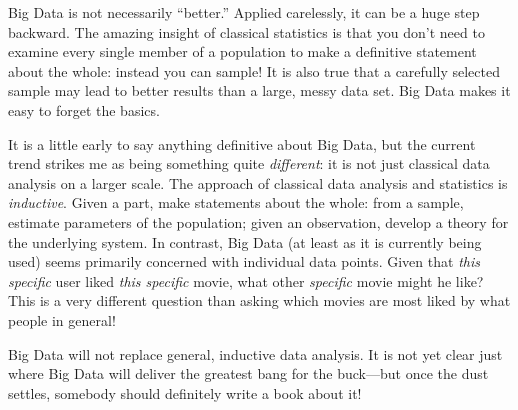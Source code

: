Big Data is not necessarily ``better.''  Applied carelessly, it can
be a huge step backward. The amazing insight of classical statistics
is that you don't need to examine every single member of a
population to make a definitive statement about the whole: instead
you can sample!  It is also true that a carefully selected sample
may lead to better results than a large, messy data set. Big Data
makes it easy to forget the basics.

It is a little early to say anything definitive about Big Data, but
the current trend strikes me as being something quite
\emph{different}: it is not just classical data analysis on a larger
scale.  The approach of classical data analysis and statistics is
\emph{inductive}. Given a part, make statements about the whole:
from a sample, estimate parameters of the population; given an
observation, develop a theory for the underlying system. In
contrast, Big Data (at least as it is currently being used) seems
primarily concerned with individual data points.  Given that
\emph{this specific} user liked \emph{this specific} movie, what
other \emph{specific} movie might he like?  This is a very different
question than asking which movies are most liked by what people in
general!

Big Data will not replace general, inductive data analysis. It is
not yet clear just where Big Data will deliver the greatest bang for
the buck---but once the dust settles, somebody should definitely
write a book about it!





\clearpage

\thispagestyle{empty}

\cleardoublepage